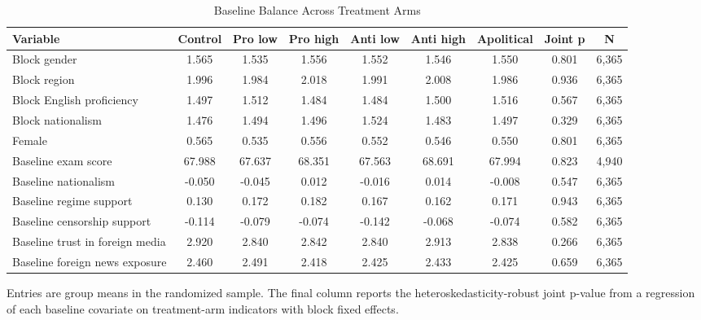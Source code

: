 \begin{table}[H]
\centering
\caption{Baseline Balance Across Treatment Arms}
\label{tab:balance}
\footnotesize
\begin{threeparttable}
\begin{tabular}{lcccccccc}
\toprule
Variable & Control & Pro low & Pro high & Anti low & Anti high & Apolitical & Joint p & N \\
\midrule
Block gender & 1.565 & 1.535 & 1.556 & 1.552 & 1.546 & 1.550 & 0.801 & 6,365 \\
Block region & 1.996 & 1.984 & 2.018 & 1.991 & 2.008 & 1.986 & 0.936 & 6,365 \\
Block English proficiency & 1.497 & 1.512 & 1.484 & 1.484 & 1.500 & 1.516 & 0.567 & 6,365 \\
Block nationalism & 1.476 & 1.494 & 1.496 & 1.524 & 1.483 & 1.497 & 0.329 & 6,365 \\
Female & 0.565 & 0.535 & 0.556 & 0.552 & 0.546 & 0.550 & 0.801 & 6,365 \\
Baseline exam score & 67.988 & 67.637 & 68.351 & 67.563 & 68.691 & 67.994 & 0.823 & 4,940 \\
Baseline nationalism & -0.050 & -0.045 & 0.012 & -0.016 & 0.014 & -0.008 & 0.547 & 6,365 \\
Baseline regime support & 0.130 & 0.172 & 0.182 & 0.167 & 0.162 & 0.171 & 0.943 & 6,365 \\
Baseline censorship support & -0.114 & -0.079 & -0.074 & -0.142 & -0.068 & -0.074 & 0.582 & 6,365 \\
Baseline trust in foreign media & 2.920 & 2.840 & 2.842 & 2.840 & 2.913 & 2.838 & 0.266 & 6,365 \\
Baseline foreign news exposure & 2.460 & 2.491 & 2.418 & 2.425 & 2.433 & 2.425 & 0.659 & 6,365 \\
\bottomrule
\end{tabular}
\begin{tablenotes}[flushleft]
\footnotesize
\item Entries are group means in the randomized sample. The final column reports the heteroskedasticity-robust joint p-value from a regression of each baseline covariate on treatment-arm indicators with block fixed effects.
\end{tablenotes}
\end{threeparttable}
\end{table}

